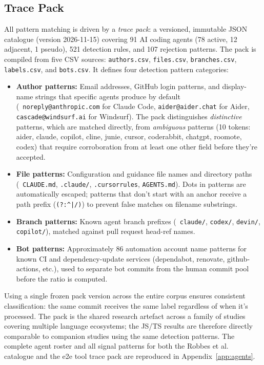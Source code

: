 \subsection{Trace Pack}

All pattern matching is driven by a \emph{trace pack}: a versioned, immutable JSON catalogue (version 2026-11-15) covering 91 AI coding agents (78 active, 12 adjacent, 1 pseudo), 521 detection rules, and 107 rejection patterns. The pack is compiled from five CSV sources: \texttt{authors.csv}, \texttt{files.csv}, \texttt{branches.csv}, \texttt{labels.csv}, and \texttt{bots.csv}. It defines four detection pattern categories:

\begin{itemize}
  \item \textbf{Author patterns:} Email addresses, GitHub login patterns, and display-name strings that specific agents produce by default (\eg\ \texttt{noreply@anthropic.com} for Claude Code, \texttt{aider@aider.chat} for Aider, \texttt{cascade@windsurf.ai} for Windsurf). The pack distinguishes \emph{distinctive} patterns, which are matched directly, from \emph{ambiguous} patterns (10 tokens: aider, claude, copilot, cline, junie, cursor, coderabbit, chatgpt, roomote, codex) that require corroboration from at least one other field before they're accepted.
  \item \textbf{File patterns:} Configuration and guidance file names and directory paths (\eg\ \texttt{CLAUDE.md}, \texttt{.claude/}, \texttt{.cursorrules}, \texttt{AGENTS.md}). Dots in patterns are automatically escaped; patterns that don't start with an anchor receive a path prefix (\texttt{(?:\^{}|/)}) to prevent false matches on filename substrings.
  \item \textbf{Branch patterns:} Known agent branch prefixes (\eg\ \texttt{claude/}, \texttt{codex/}, \texttt{devin/}, \texttt{copilot/}), matched against pull request head-ref names.
  \item \textbf{Bot patterns:} Approximately 86 automation account name patterns for known CI and dependency-update services (dependabot, renovate, github-actions, etc.), used to separate bot commits from the human commit pool before the ratio is computed.
\end{itemize}

Using a single frozen pack version across the entire corpus ensures consistent classification: the same commit receives the same label regardless of when it's processed. The pack is the shared research artefact across a family of studies covering multiple language ecosystems; the JS/TS results are therefore directly comparable to companion studies using the same detection patterns. The complete agent roster and all signal patterns for both the Robbes et al.~\cite{robbesAgenticMuch2026} catalogue and the e2e tool trace pack are reproduced in Appendix~\ref{app:agents}.

